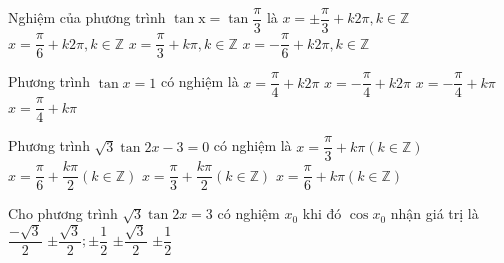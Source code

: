 \begin{ex}%
	Nghiệm của phương trình $\tan \mathrm{x}=\tan \dfrac{\pi}{3}$ là
	\choice
	{$x=\pm \dfrac{\pi}{3}+k2\pi,k\in \mathbb{Z}$}
	{$x=\dfrac{\pi}{6}+k2\pi,k\in \mathbb{Z}$}
	{\True $x=\dfrac{\pi}{3}+k\pi,k\in \mathbb{Z}$}
	{$x=-\dfrac{\pi}{6}+k2\pi,k\in \mathbb{Z}$}
\end{ex}
%		
\begin{ex}%
	Phương trình $\tan x=1$ có nghiệm là
	\choice
	{$x=\dfrac{\pi}{4}+k2\pi $}
	{$x=-\dfrac{\pi}{4}+k2\pi $}
	{$x=-\dfrac{\pi}{4}+k\pi $}
	{\True $x=\dfrac{\pi}{4}+k\pi $}
\end{ex}
\begin{ex}%
	Phương trình $\sqrt{3}\tan 2x-3=0$ có nghiệm là
	\choice
	{$x=\dfrac{\pi}{3}+k\pi \left(k\in \mathbb{Z}\right)$}
	{\True $x=\dfrac{\pi}{6}+\dfrac{k\pi}{2}\left(k\in \mathbb{Z}\right)$}
	{$x=\dfrac{\pi}{3}+\dfrac{k\pi}{2}\left(k\in \mathbb{Z}\right)$}
	{$x=\dfrac{\pi}{6}+k\pi \left(k\in \mathbb{Z}\right)$}
\end{ex}
\begin{ex}%
	Cho phương trình $\sqrt{3}\tan 2x=3$ có nghiệm $x_0$ khi đó $\cos x_0$ nhận giá trị là
	\choice
	{$\dfrac{-\sqrt{3}}{2}$}
	{\True $\pm \dfrac{\sqrt{3}}{2};\pm \dfrac{1}{2}$}
	{$\pm \dfrac{\sqrt{3}}{2}$}
	{$\pm \dfrac{1}{2}$}
\end{ex}
